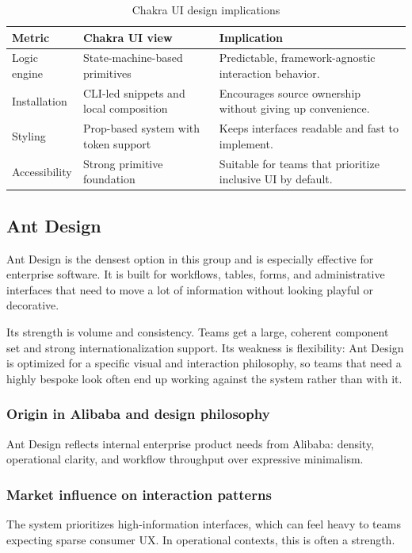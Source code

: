 \documentclass[11pt,twoside,a4paper]{article}
\begin{document}
\begin{table}[htbp]
  \centering
  \caption{Chakra UI design implications}
  \begin{tabularx}{\textwidth}{@{}p{}p{}Y@{}}
    \toprule
    \textbf{Metric} & \textbf{Chakra UI view} & \textbf{Implication} \\
    \midrule
    Logic engine & State-machine-based primitives & Predictable, framework-agnostic interaction behavior. \\
    Installation & CLI-led snippets and local composition & Encourages source ownership without giving up convenience. \\
    Styling & Prop-based system with token support & Keeps interfaces readable and fast to implement. \\
    Accessibility & Strong primitive foundation & Suitable for teams that prioritize inclusive UI by default. \\
    \bottomrule
  \end{tabularx}
\end{table}

\subsection{Ant Design}
Ant Design is the densest option in this group and is especially effective for enterprise software. It is built for workflows, tables, forms, and administrative interfaces that need to move a lot of information without looking playful or decorative.

Its strength is volume and consistency. Teams get a large, coherent component set and strong internationalization support. Its weakness is flexibility: Ant Design is optimized for a specific visual and interaction philosophy, so teams that need a highly bespoke look often end up working against the system rather than with it.

\subsubsection{Origin in Alibaba and design philosophy}
Ant Design reflects internal enterprise product needs from Alibaba: density, operational clarity, and workflow throughput over expressive minimalism.

\subsubsection{Market influence on interaction patterns}
The system prioritizes high-information interfaces, which can feel heavy to teams expecting sparse consumer UX. In operational contexts, this is often a strength.
\end{document}
